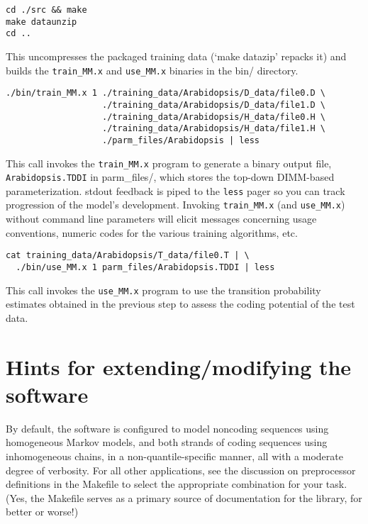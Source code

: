 \documentclass[12pt]{article}
\begin{document}
\begin{verbatim}
cd ./src && make
make dataunzip
cd ..
\end{verbatim}

This uncompresses the packaged training data (`make datazip' repacks it)
and builds the \texttt{train\_MM.x} and \texttt{use\_MM.x}
binaries in the bin/ directory.

\begin{verbatim}
./bin/train_MM.x 1 ./training_data/Arabidopsis/D_data/file0.D \
                   ./training_data/Arabidopsis/D_data/file1.D \
                   ./training_data/Arabidopsis/H_data/file0.H \
                   ./training_data/Arabidopsis/H_data/file1.H \
                   ./parm_files/Arabidopsis | less
\end{verbatim}

This call invokes the \texttt{train\_MM.x} program to generate a
binary output file, \texttt{Arabidopsis.TDDI} in parm\_files/,
which stores the top-down DIMM-based
parameterization.  stdout feedback is piped to the \texttt{less}
pager so you can track progression of the model's development.
Invoking \texttt{train\_MM.x} (and \texttt{use\_MM.x})
without command line parameters will elicit
messages concerning usage conventions, numeric
codes for the various training algorithms, etc.

\begin{verbatim}
cat training_data/Arabidopsis/T_data/file0.T | \
  ./bin/use_MM.x 1 parm_files/Arabidopsis.TDDI | less
\end{verbatim}

This call invokes the \texttt{use\_MM.x} program to use the
transition probability estimates obtained in the previous step
to assess the coding potential of the test data.

\section{Hints for extending/modifying the software}
By default, the software is configured to model noncoding sequences
using homogeneous Markov models, and both strands of coding sequences using
inhomogeneous chains, in a non-quantile-specific manner, all with
a moderate degree of verbosity.
For all other applications, see the discussion on
preprocessor definitions in the Makefile to select the appropriate
combination for your task.  (Yes, the Makefile serves as a primary
source of documentation for the library, for better or worse!)
\end{document}
